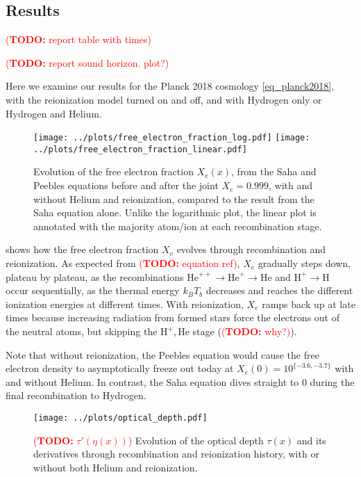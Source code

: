 \documentclass[10pt,a4paper]{article}
\newcommand\TODO[1]{\textcolor{red}{(\textbf{TODO:} #1)}}
\begin{document}
\subsection{Results}

\TODO{report table with times}

\TODO{report sound horizon. plot?}

Here we examine our results for the Planck 2018 cosmology \eqref{eq_planck2018},
with the reionization model turned on and off,
and with Hydrogen only or Hydrogen and Helium.

\begin{figure}
	\centering
	\texttt{[image: ../plots/free\_electron\_fraction\_log.pdf]}
	\texttt{[image: ../plots/free\_electron\_fraction\_linear.pdf]}
	\caption{%
		Evolution of the free electron fraction $X_e(x)$,
		from the Saha and Peebles equations before and after the joint $X_e = 0.999$,
		with and without Helium and reionization, compared to the result from the Saha equation alone.
		Unlike the logarithmic plot, the linear plot is annotated with the majority atom/ion at each recombination stage.
	}
	\label{fig_free_electron_fraction}
\end{figure}

 shows how the free electron fraction $X_e$ evolves through recombination and reionization.
As expected from \TODO{equation ref},
$X_e$ gradually steps down, plateau by plateau, as the recombinations $\text{He}^{++} \rightarrow \text{He}^+ \rightarrow \text{He}$ and $\text{H}^+ \rightarrow \text{H}$ occur sequentially,
as the thermal energy $k_B T_b$ decreases and reaches the different ionization energies at different times.
With reionization, $X_e$ ramps back up at late times because increasing radiation from formed stars force the electrons out of the neutral atoms,
but skipping the $\text{H}^+, \text{He}$ stage (\TODO{why?}).

Note that without reionization, the Peebles equation would cause the free electron density to asymptotically freeze out today at $X_e(0) = 10^{\{-3.6, -3.7\}}$ with and without Helium.
In contrast, the Saha equation dives straight to $0$ during the final recombination to Hydrogen.

\begin{figure}
	\centering
	\texttt{[image: ../plots/optical\_depth.pdf]}
	\caption{\TODO{$\tau'(\eta(x))$} Evolution of the optical depth $\tau(x)$ and its derivatives through recombination and reionization history, with or without both Helium and reionization.}
	\label{fig_optical_depth}
\end{figure}
\end{document}
